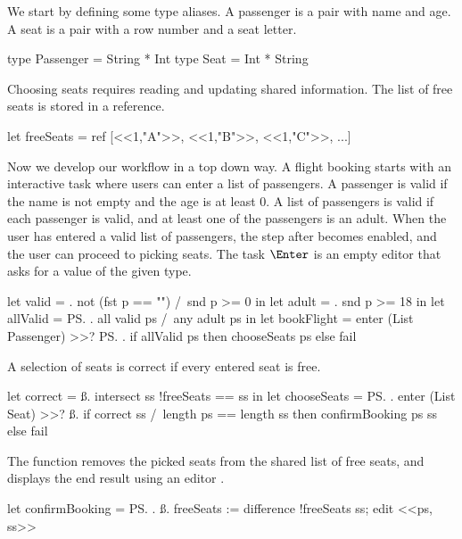 \begin{example}
\label{exm:flight-booking}

We start by defining some type aliases.
A passenger is a pair with name and age.
A seat is a pair with a row number and a seat letter.
\begin{TASK}
  type Passenger = String * Int
  type Seat = Int * String
\end{TASK}

Choosing seats requires reading and updating shared information.
The list of free seats is stored in a reference. %
\begin{TASK}
  let freeSeats = ref [<<1,"A">>, <<1,"B">>, <<1,"C">>, ...]
\end{TASK}

Now we develop our workflow in a top down way.
A flight booking starts with an interactive task 
where users can enter a list of passengers.
A passenger is valid if the name is not empty and the age is at least 0.
A list of passengers is valid if each passenger is valid, and at least one of the passengers is an adult.
When the user has entered a valid list of passengers, the step after  becomes enabled,
and the user can proceed to picking seats.
The task $\Enter$ is an empty editor that asks for a value of the given type.
\begin{TASK}
  let valid = \p. not (fst p == "") /\ snd p >= 0 in
  let adult = \p. snd p >= 18 in
  let allValid = \ps. all valid ps /\ any adult ps in
  let bookFlight = enter (List Passenger) >>? \ps.
    if allValid ps then chooseSeats ps else fail
\end{TASK}
A selection of seats is correct if every entered seat is free.
\begin{TASK}
  let correct = \ss. intersect ss !freeSeats == ss in
  let chooseSeats = \ps. enter (List Seat) >>? \ss.
    if correct ss /\ length ps == length ss then confirmBooking ps ss else fail
\end{TASK}

The function  removes the picked seats from the shared list of free seats,
and displays the end result using an editor .
\begin{TASK}
  let confirmBooking = \ps. \ss.
    freeSeats := difference !freeSeats ss; edit <<ps, ss>>
\end{TASK}


\end{example}

